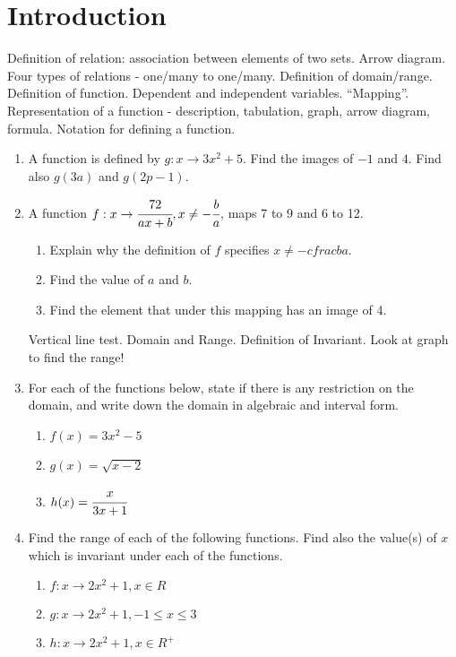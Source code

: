 \documentclass[letterpaper]{article}
\begin{document}
\section{Introduction}

Definition of relation: association between elements of two sets. Arrow diagram. Four types of relations - one/many to one/many. Definition of domain/range. Definition of function. Dependent and independent variables. ``Mapping''. Representation of a function - description, tabulation, graph, arrow diagram, formula. Notation for defining a function.

\begin{enumerate}
\item A function is defined by $g: x \to 3x^2 + 5$. Find the images of $-1$ and $4$. Find also $g(3a)$ and $g(2p-1)$.

\item A function $f: x \to \cfrac{72}{ax + b}, x \ne -\cfrac{b}{a}$, maps 7 to 9 and 6 to 12.
\begin{enumerate}
\item Explain why the definition of $f$ specifies $x \ne -cfrac{b}{a}$.
\item Find the value of $a$ and $b$.
\item Find the element that under this mapping has an image of 4.
\end{enumerate}

Vertical line test. Domain and Range. Definition of Invariant. Look at graph to find the range!

\item For each of the functions below, state if there is any restriction on the domain, and write down the domain in algebraic and interval form.

\begin{enumerate}
\item $f(x) = 3x^2 - 5$
\item $g(x) = \sqrt{x-2}$
\item $h(x) = \cfrac{x}{3x + 1}$
\end{enumerate}

\item Find the range of each of the following functions. Find also the value(s) of $x$ which is invariant under each of the functions.

\begin{enumerate}
\item $f: x \to 2x^2 + 1, x \in R$
\item $g: x \to 2x^2 + 1, -1 \le x \le 3$
\item $h: x \to 2x^2 + 1, x \in R^+$
\end{enumerate}


\end{enumerate}
\end{document}
